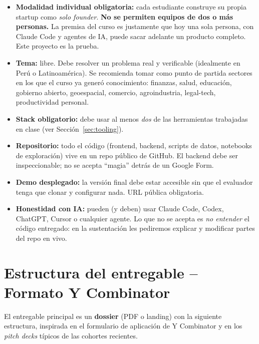 \documentclass[11pt,a4paper]{article}
\begin{document}
\begin{itemize}[leftmargin=1.2em,itemsep=2pt,topsep=2pt]
  \item \textbf{Modalidad individual obligatoria:} cada estudiante construye
        su propia startup como \emph{solo founder}. \textbf{No se permiten equipos
        de dos o m\'as personas.} La premisa del curso es justamente que hoy una
        sola persona, con Claude Code y agentes de IA, puede sacar adelante un
        producto completo. Este proyecto es la prueba.
  \item \textbf{Tema:} libre. Debe resolver un problema real y verificable
        (idealmente en Per\'u o Latinoam\'erica). Se recomienda tomar como punto
        de partida sectores en los que el curso ya gener\'o conocimiento:
        finanzas, salud, educaci\'on, gobierno abierto, geoespacial, comercio,
        agroindustria, legal-tech, productividad personal.
  \item \textbf{Stack obligatorio:} debe usar al menos \emph{dos} de las
        herramientas trabajadas en clase (ver Secci\'on~\ref{sec:tooling}).
  \item \textbf{Repositorio:} todo el c\'odigo (frontend, backend, scripts de datos,
        notebooks de exploraci\'on) vive en un repo p\'ublico de GitHub. El backend
        debe ser inspeccionable; no se acepta ``magia'' detr\'as de un Google Form.
  \item \textbf{Demo desplegado:} la versi\'on final debe estar accesible sin que
        el evaluador tenga que clonar y configurar nada. URL p\'ublica obligatoria.
  \item \textbf{Honestidad con IA:} pueden (y deben) usar Claude Code, Codex,
        ChatGPT, Cursor o cualquier agente. Lo que no se acepta es \emph{no entender}
        el c\'odigo entregado: en la sustentaci\'on les pediremos explicar y modificar
        partes del repo en vivo.
\end{itemize}

\section{Estructura del entregable -- Formato Y Combinator}

El entregable principal es un \textbf{dossier} (PDF o landing) con la siguiente
estructura, inspirada en el formulario de aplicaci\'on de Y Combinator y en los
\emph{pitch decks} t\'ipicos de las cohortes recientes.
\end{document}
